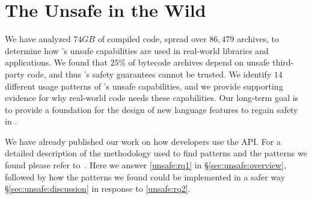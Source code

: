 


\newcommand{\hdr}{\rowcolor{header-color}}
\newcommand{\alt}{\rowcolor{alt-row-color}}
\newcommand{\row}{}

\newcommand{\javaclass}[1]{\emph{#1}}
\newcommand{\member}[1]{\emph{#1}}
\newcommand{\smugroup}[1]{\textsl{#1}}
\newcommand{\stackoverflow}{Stack Overflow}

\newcommand\namealloc{Allocate an Object without Invoking a Constructor}
\newcommand\nameprobyte{Process Byte Arrays in Block}
\newcommand\namelockfree{Atomic Operations}
\newcommand\namefence{Strongly Consistent Shared Variables}
\newcommand\namepark{Park/Unpark Threads}
\newcommand\namefinalfield{Update Final Fields}
\newcommand\namemonitor{Non-Lexically-Scoped Monitors}
\newcommand\nameserialization{Serialization/Deserialization}
\newcommand\namemarshalling{Foreign Data Access and Object Marshaling}
\newcommand\namethrow{Throw Checked Exceptions without Being Declared}
\newcommand\namesize{Get the Size of an Object or an Array}
\newcommand\namelargearrays{Large Arrays and Off-Heap Data Structures}
\newcommand\namepage{Get Memory Page Size}
\newcommand\nameclass{Load Class without Security Checks}

\chapter{The \java{} Unsafe \api{} in the Wild}
\label{cha:unsafe}

We have analyzed $74 GB$ of compiled \java{} code,
spread over $86,479$ \java{} archives,
to determine how \java{}'s unsafe capabilities are used in real-world libraries and applications.
We found that $25\%$ of \java{} bytecode archives depend on unsafe third-party \java{} code,
and thus \java{}'s safety guarantees cannot be trusted.
We identify $14$ different usage patterns of \java{}'s unsafe capabilities,
and we provide supporting evidence for why real-world code needs these capabilities.
Our long-term goal is to provide a foundation for the design of new language features to regain safety in \java{}.

We have already published our work on how developers use the  API.
For a detailed description of the methodology used to find patterns and the patterns we found please refer to~\cite{mastrangeloUseYourOwn2015}.
Here we answer \ref{unsafe:rq1}
in \S\ref{sec:unsafe:overview},
followed by how the patterns we found could be implemented in a safer way \S\ref{sec:unsafe:discussion}
in response to \ref{unsafe:rq2}.



